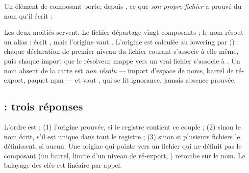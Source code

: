 Un élément de composant porte, depuis , ce que \emph{son propre fichier} a prouvé du
nom qu'il écrit :



Les deux moitiés servent. Le fichier départage vingt composants  ; le nom résout un
alias :  écrit , mais l'origine vaut
. L'origine est calculée au lowering par 
() : chaque déclaration de premier niveau du
fichier courant s'associe à elle-même, puis chaque import que le résolveur mappe vers un vrai
fichier s'associe à . Un nom absent de la carte est
\emph{non résolu} --- import d'espace de noms, barrel de ré-export, paquet npm --- et
 vaut , qui se lit \og ignorance\fg{}, jamais \og absence prouvée\fg.

\subsection{ : trois réponses}



L'ordre est : (1) l'origine prouvée, si le registre contient ce couple ; (2) sinon le nom écrit,
s'il est unique dans tout le registre ; (3) sinon  si plusieurs fichiers le
définissent,  si aucun. Une origine qui pointe vers un fichier qui ne définit pas
le composant (un barrel, limite d'un niveau de ré-export, ) retombe sur le nom. Le
balayage des clés est linéaire par appel.

